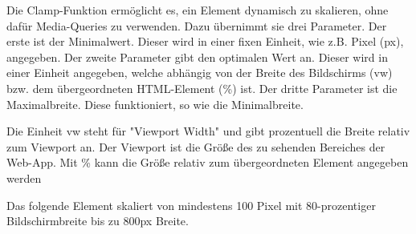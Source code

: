
Die Clamp-Funktion ermöglicht es, ein Element dynamisch zu skalieren, ohne dafür Media-Queries zu verwenden. Dazu übernimmt sie drei Parameter. Der erste ist der Minimalwert. Dieser wird in einer fixen Einheit, wie z.B. Pixel (px), angegeben. Der zweite Parameter gibt den optimalen Wert an. Dieser wird in einer Einheit angegeben, welche abhängig von der Breite des Bildschirms (vw) bzw. dem übergeordneten HTML-Element (\%) ist. Der dritte Parameter ist die Maximalbreite. Diese funktioniert, so wie die Minimalbreite. 

Die Einheit vw steht für "Viewport Width" und gibt prozentuell die Breite relativ zum Viewport an. Der Viewport ist die Größe des zu sehenden Bereiches der Web-App. Mit \% kann die Größe relativ zum übergeordneten Element angegeben werden

Das folgende Element skaliert von mindestens 100 Pixel mit 80-prozentiger Bildschirmbreite bis zu 800px Breite.

